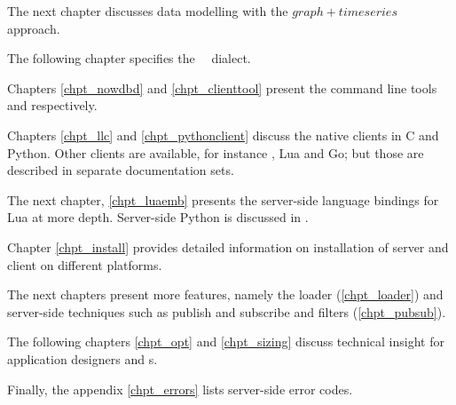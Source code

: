 The next chapter discusses data modelling with
the $graph+timeseries$ approach.

The following chapter specifies the \nowdb\ \sql\ dialect.

Chapters \ref{chpt_nowdbd} and \ref{chpt_clienttool}
present the command line tools 
and  respectively.

Chapters \ref{chpt_llc} and \ref{chpt_pythonclient}
discuss the native clients in C and Python.
Other clients are available, for instance
\CC, Lua and Go; but those are described in separate
documentation sets.

The next chapter, \ref{chpt_luaemb} presents the server-side
language bindings for Lua at more depth. Server-side Python
is discussed in .

Chapter \ref{chpt_install} provides detailed information
on installation of server and client on different
platforms.

The next chapters present more features,
namely the loader (\ref{chpt_loader}) and
server-side techniques such as publish and subscribe and
filters (\ref{chpt_pubsub}).

The following chapters 
\ref{chpt_opt} and \ref{chpt_sizing}
discuss technical insight
for application designers and s.

Finally, the appendix \ref{chpt_errors} lists server-side
error codes.

